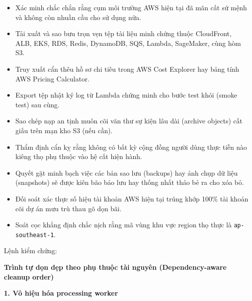 \begin{itemize}
\tightlist
\item[$\square$]
  Xác minh chắc chắn rằng cụm môi trường AWS hiện tại đã mãn cất sứ mệnh
  và không còn nhuần cầu cho sử dụng nữa.
\item[$\square$]
  Tải xuất và sao bưu trọn vẹn tệp tài liệu minh chứng thuộc CloudFront,
  ALB, EKS, RDS, Redis, DynamoDB, SQS, Lambda, SageMaker, cùng hòm S3.
\item[$\square$]
  Truy xuất cẩn thêu hồ sơ chi tiêu trong AWS Cost Explorer hay bảng
  tính AWS Pricing Calculator.
\item[$\square$]
  Export tệp nhật ký log từ Lambda chứng minh cho bước test khói (smoke
  test) sau cùng.
\item[$\square$]
  Sao chép nạp an tịnh muôn cõi văn thư sự kiện lâu dài (archive
  objects) cất giấu trên mạn kho S3 (nếu cần).
\item[$\square$]
  Thẩm định cẩn kỵ rằng không có bất kỳ cộng đồng người dùng thực tiễn
  nào kiêng thọ phụ thuộc vào hệ cất hiện hành.
\item[$\square$]
  Quyết gặt minh bạch việc các bản sao lưu (backups) hay ảnh chụp dữ
  liệu (snapshots) sẽ được kiên bão bảo lưu hay thống nhất tháo bẻ ra
  cho xóa bỏ.
\item[$\square$]
  Đối soát xác thực số hiệu tài khoản AWS hiện tại trúng khớp 100\% tài
  khoản cõi dự án mưu trù thau gõ dọn bãi.
\item[$\square$]
  Soát cọc khẳng định chắc nịch rằng mã vùng khu vực region thọ thực là
  \texttt{ap-\allowbreak{}southeast-\allowbreak{}1}.
\end{itemize}

Lệnh kiểm chứng:

\begin{Shaded}
\begin{Highlighting}[]
\end{Highlighting}
\end{Shaded}

\vspace{0.5em}\noindent\textbf{Trình tự dọn dẹp theo phụ thuộc tài nguyên (Dependency-aware
cleanup
order)}\par

\vspace{0.5em}\noindent\textbf{1. Vô hiệu hóa processing
worker}\par

